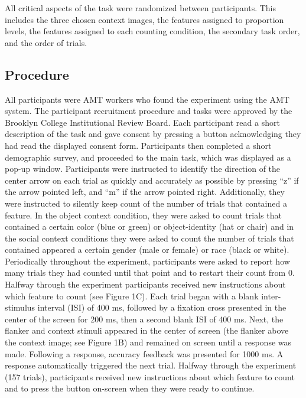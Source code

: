 \documentclass[english,,man,floatsintext]{apa6}
\begin{document}
All critical aspects of the task were randomized between participants.
This includes the three chosen context images, the features assigned to
proportion levels, the features assigned to each counting condition, the
secondary task order, and the order of trials.

\subsection{Procedure}\label{procedure}

All participants were AMT workers who found the experiment using the AMT
system. The participant recruitment procedure and tasks were approved by
the Brooklyn College Institutional Review Board. Each participant read a
short description of the task and gave consent by pressing a button
acknowledging they had read the displayed consent form. Participants
then completed a short demographic survey, and proceeded to the main
task, which was displayed as a pop-up window. Participants were
instructed to identify the direction of the center arrow on each trial
as quickly and accurately as possible by pressing \enquote{z} if the
arrow pointed left, and \enquote{m} if the arrow pointed right.
Additionally, they were instructed to silently keep count of the number
of trials that contained a feature. In the object context condition,
they were asked to count trials that contained a certain color (blue or
green) or object-identity (hat or chair) and in the social context
conditions they were asked to count the number of trials that contained
appeared a certain gender (male or female) or race (black or white).
Periodically throughout the experiment, participants were asked to
report how many trials they had counted until that point and to restart
their count from 0. Halfway through the experiment participants received
new instructions about which feature to count (see Figure 1C). Each
trial began with a blank inter-stimulus interval (ISI) of 400 ms,
followed by a fixation cross presented in the center of the screen for
200 ms, then a second blank ISI of 400 ms. Next, the flanker and context
stimuli appeared in the center of screen (the flanker above the context
image; see Figure 1B) and remained on screen until a response was made.
Following a response, accuracy feedback was presented for 1000 ms. A
response automatically triggered the next trial. Halfway through the
experiment (157 trials), participants received new instructions about
which feature to count and to press the button on-screen when they were
ready to continue.
\end{document}

